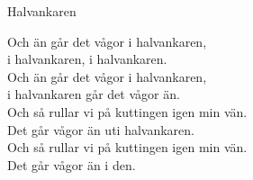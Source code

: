 \begin{song}{Halvankaren}

	
	Och än går det vågor i halvankaren,\\
	i halvankaren, i halvankaren.\\
	Och än går det vågor i halvankaren,\\
	i halvankaren går det vågor än.\\
	Och så rullar vi på kuttingen igen min vän.\\
	Det går vågor än uti halvankaren.\\
	Och så rullar vi på kuttingen igen min vän.\\
	Det går vågor än i den.
	
\end{song}
